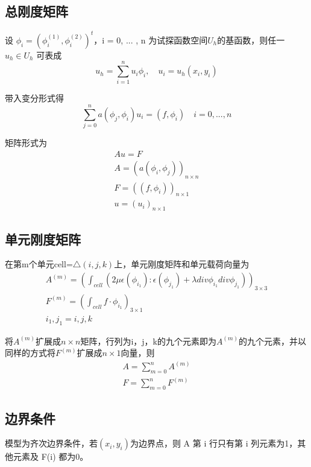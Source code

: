 \documentclass[UTF8,titlepage]{ctexart}
\begin{document}
\subsection{总刚度矩阵}

设 $\phi_i = (\phi_i^{(1)}, \phi_i^{(2)})^t$，i = 0, ... , n 为试探函数空间$U_h$的基函数，则任一 $u_h \in U_h$ 可表成
$$
	u_h = \sum\limits_{i=1}^n u_i \phi_i, \quad u_i = u_h(x_i,y_i)
$$ 

带入变分形式得
$$
	\sum\limits_{j=0}^n a(\phi_j, \phi_i) u_i = (f,\phi_i) \quad i=0, ... ,n
$$

矩阵形式为
$$
\begin{matrix}
	A u = F \\
	A = (a(\phi_i, \phi_j))_{n \times n} \\
	F = ((f,\phi_i))_{n \times 1} \\
	u = (u_i)_{n \times 1}
\end{matrix}
$$

\subsection{单元刚度矩阵}

在第m个单元cell=$\bigtriangleup(i,j,k)$上，单元刚度矩阵和单元载荷向量为
$$
\begin{matrix}
	A^{(m)} = (\int_{cell} (2 \mu \epsilon(\phi_{i_1}) : \epsilon(\phi_{j_1}) + \lambda div \phi_{i_1} div \phi_{j_1}))_{3 \times 3} \\
	F^{(m)} = (\int_{cell} f \cdot \phi_{i_1})_{3 \times 1} \\
	i_1, j_1 = i, j, k
\end{matrix} 
$$

将$A^{(m)}$扩展成$n \times n$矩阵，行列为i，j，k的九个元素即为$A^{(m)}$的九个元素，并以同样的方式将$F^{(m)}$扩展成$n \times 1$向量，则
$$
\begin{matrix} 
	A = \sum\limits_{m=0}^n A^{(m)} \\
	F = \sum\limits_{m=0}^n F^{(m)}
\end{matrix}
$$

\subsection{边界条件}

模型为齐次边界条件，若$(x_i,y_i)$为边界点，则 A 第 i 行只有第 i 列元素为1，其他元素及  F(i) 都为0。


%
%
\end{document}
